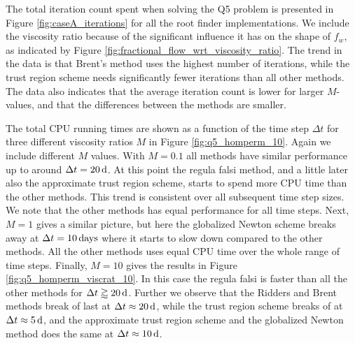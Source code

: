 The total iteration count spent when solving the Q5 problem is presented in Figure \ref{fig:caseA_iterations} for all the root finder implementations. We include the viscosity ratio because of the significant influence it has on the shape of $f_w$, as indicated by Figure \ref{fig:fractional_flow_wrt_viscosity_ratio}. The trend in the data is that Brent's method uses the highest number of iterations, while the trust region scheme needs significantly fewer iterations than all other methods. The data also indicates that the average iteration count is lower for larger $M$-values, and that the differences between the methods are smaller.


The total CPU running times are shown as a function of the time step $\Delta t$ for three different viscosity ratios $M$ in Figure \ref{fig:q5_homperm_10}. Again we include different $M$ values. With $M = 0.1$ all methods have similar performance up to around $\Delta t = \unit[20]{d}$. At this point the regula falsi method, and a little later also the approximate trust region scheme, starts to spend more CPU time than the other methods. This trend is consistent over all subsequent time step sizes. We note that the other methods has equal performance for all time steps.
Next, $M = 1$ gives a similar picture, but here the globalized Newton scheme breaks away at $\Delta t = \unit[10]{days}$ where it starts to slow down compared to the other methods. All the other methods uses equal CPU time over the whole range of time steps.
Finally, $M = 10$ gives the results in Figure \ref{fig:q5_homperm_viscrat_10}. In this case the regula falsi is faster than all the other methods for $\Delta t \gtrapprox \unit[20]{d}$. Further we observe that the Ridders and Brent methods break of last at $\Delta t \approx \unit[20]{d}$, while the trust region scheme breaks of at $\Delta t \approx \unit[5]{d}$, and the approximate trust region scheme and the globalized Newton method does the same at $\Delta t \approx \unit[10]{d}$.



